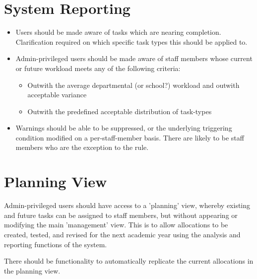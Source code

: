 \documentclass[12pt, a4paper]{article}
\begin{document}
\section{System Reporting}
\begin{itemize}
\item Users should be made aware of tasks which are nearing completion. Clarification required on which specific task types this should be applied to.
\item Admin-privileged users should be made aware of staff members whose current or future workload meets any of the following criteria:
\begin{itemize}
\item Outwith the average departmental (or school?) workload and outwith acceptable variance
\item Outwith the predefined acceptable distribution of task-types
\end{itemize}

\item Warnings should be able to be suppressed, or the underlying triggering condition modified on a per-staff-member basis. There are likely to be staff members who are the exception to the rule.
\end{itemize}

\section{Planning View}
Admin-privileged users should have access to a 'planning' view, whereby existing and future tasks can be assigned to staff members, but without appearing or modifying the main 'management' view. This is to allow allocations to be created, tested, and revised for the next academic year using the analysis and reporting functions of the system.

There should be functionality to automatically replicate the current allocations in the planning view.
\end{document}
